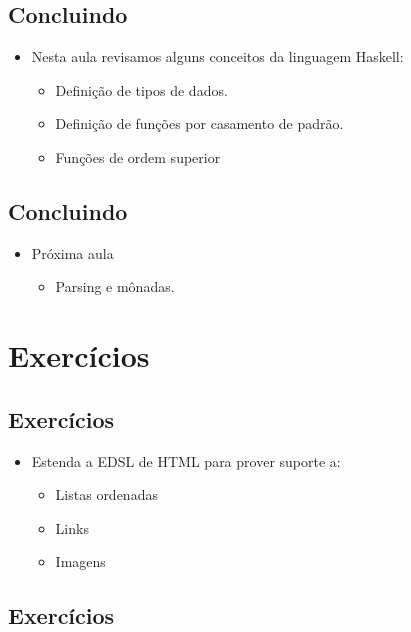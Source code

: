 \documentclass[11pt]{article}
\begin{document}
\subsection*{Concluindo}
\label{sec:org1799337}

\begin{itemize}
\item Nesta aula revisamos alguns conceitos da linguagem Haskell:
\begin{itemize}
\item Definição de tipos de dados.
\item Definição de funções por casamento de padrão.
\item Funções de ordem superior
\end{itemize}
\end{itemize}
\subsection*{Concluindo}
\label{sec:orgc270251}

\begin{itemize}
\item Próxima aula
\begin{itemize}
\item Parsing e mônadas.
\end{itemize}
\end{itemize}
\section*{Exercícios}
\label{sec:org5108ca3}

\subsection*{Exercícios}
\label{sec:org185ff97}

\begin{itemize}
\item Estenda a EDSL de HTML para prover suporte a:
\begin{itemize}
\item Listas ordenadas
\item Links
\item Imagens
\end{itemize}
\end{itemize}
\subsection*{Exercícios}
\label{sec:org2b3c6bc}
\end{document}
